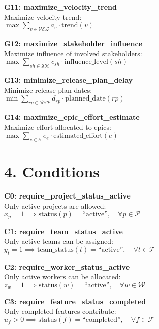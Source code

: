 \documentclass[12pt]{article}
\begin{document}
    \item \textbf{G11: maximize\_velocity\_trend} \\
    Maximize velocity trend: \\
    $ \max \sum_{v \in \mathcal{VEL}} a_v \cdot \text{trend}(v) $

    \item \textbf{G12: maximize\_stakeholder\_influence} \\
    Maximize influence of involved stakeholders: \\
    $ \max \sum_{sh \in \mathcal{SH}} c_{sh} \cdot \text{influence\_level}(sh) $

    \item \textbf{G13: minimize\_release\_plan\_delay} \\
    Minimize release plan dates: \\
    $ \min \sum_{rp \in \mathcal{REP}} d_{rp} \cdot \text{planned\_date}(rp) $

    \item \textbf{G14: maximize\_epic\_effort\_estimate} \\
    Maximize effort allocated to epics: \\
    $ \max \sum_{e \in \mathcal{E}} e_e \cdot \text{estimated\_effort}(e) $

\section{4. Conditions}
\item \textbf{C0: require\_project\_status\_active} \\
    Only active projects are allowed: \\
    $ x_p = 1 \implies \text{status}(p) = \text{``active''}, \quad \forall p \in \mathcal{P} $

    \item \textbf{C1: require\_team\_status\_active} \\
    Only active teams can be assigned: \\
    $ y_t = 1 \implies \text{team\_status}(t) = \text{``active''}, \quad \forall t \in \mathcal{T} $

    \item \textbf{C2: require\_worker\_status\_active} \\
    Only active workers can be allocated: \\
    $ z_w = 1 \implies \text{status}(w) = \text{``active''}, \quad \forall w \in \mathcal{W} $

    \item \textbf{C3: require\_feature\_status\_completed} \\
    Only completed features contribute: \\
    $ u_f > 0 \implies \text{status}(f) = \text{``completed''}, \quad \forall f \in \mathcal{F} $
\end{document}
